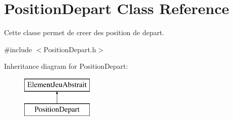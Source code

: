 \hypertarget{class_position_depart}{\section{Position\-Depart Class Reference}
\label{class_position_depart}
}


Cette classe permet de creer des position de depart.  




{\ttfamily \#include $<$Position\-Depart.\-h$>$}

Inheritance diagram for Position\-Depart\-:\begin{figure}[H]
\begin{center}
\leavevmode
\includegraphics[height=2.000000cm]{class_position_depart}
\end{center}
\end{figure}
